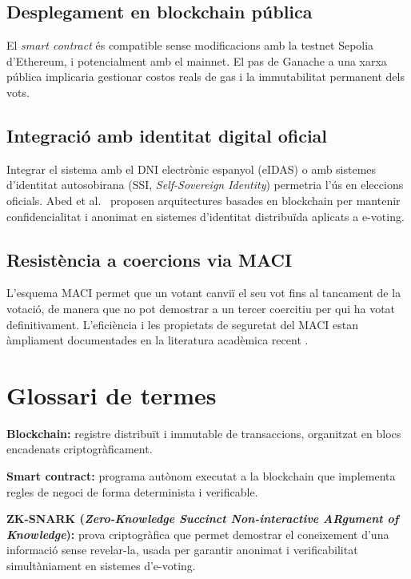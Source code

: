 \documentclass[12pt,a4paper,catalan]{article}
\begin{document}
\subsection{Desplegament en blockchain pública}

El \textit{smart contract} és compatible sense modificacions amb la testnet Sepolia d'Ethereum, i potencialment amb el mainnet. El pas de Ganache a una xarxa pública implicaria gestionar costos reals de gas i la immutabilitat permanent dels vots.

\subsection{Integració amb identitat digital oficial}

Integrar el sistema amb el DNI electrònic espanyol (eIDAS) o amb sistemes d'identitat autosobirana (SSI, \textit{Self-Sovereign Identity}) permetria l'ús en eleccions oficials. Abed et al.\ \cite{abed2024} proposen arquitectures basades en blockchain per mantenir confidencialitat i anonimat en sistemes d'identitat distribuïda aplicats a e-voting.

\subsection{Resistència a coercions via MACI}

L'esquema MACI permet que un votant canviï el seu vot fins al tancament de la votació, de manera que no pot demostrar a un tercer coercitiu per qui ha votat definitivament. L'eficiència i les propietats de seguretat del MACI estan àmpliament documentades en la literatura acadèmica recent \cite{ethereum_zkp}.

\section{Glossari de termes}

\textbf{Blockchain:} registre distribuït i immutable de transaccions, organitzat en blocs encadenats criptogràficament.

\textbf{Smart contract:} programa autònom executat a la blockchain que implementa regles de negoci de forma determinista i verificable.

\textbf{ZK-SNARK (\textit{Zero-Knowledge Succinct Non-interactive ARgument of Knowledge}):} prova criptogràfica que permet demostrar el coneixement d'una informació sense revelar-la, usada per garantir anonimat i verificabilitat simultàniament en sistemes d'e-voting.
\end{document}
